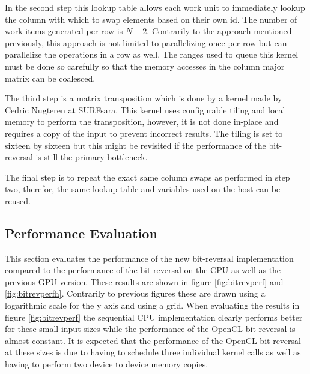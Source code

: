 \documentclass[conference]{IEEEtran}
\begin{document}
In the second step this lookup table allows each work unit to immediately
lookup the column with which to swap elements based on their own id. The number
of work-items generated per row is $N-2$. Contrarily to the approach
mentioned previously, this approach is not limited to parallelizing once per
row but can parallelize the operations in a row as well. The ranges used to
queue this kernel must be done so carefully so that the memory accesses in the
column major matrix can be coalesced.

The third step is a matrix transposition which is done by a kernel made by
Cedric Nugteren at SURFsara\cite{cedric}. This kernel uses configurable tiling
and local memory to perform the transposition, however, it is not done in-place
and requires a copy of the input to prevent incorrect results. The tiling is
set to sixteen by sixteen but this might be revisited if the performance of
the bit-reversal is still the primary bottleneck.

The final step is to repeat the exact same column swaps as performed in step 
two, therefor, the same lookup table and variables used on the host can be
reused.

\subsection{Performance Evaluation}

This section evaluates the performance of the new bit-reversal implementation
compared to the performance of the bit-reversal on the CPU as well as the
previous GPU version. These results are shown in figure \ref{fig:bitrevperf}
and \ref{fig:bitrevperfh}. Contrarily to previous figures these are drawn using
a logarithmic scale for the y axis and using a grid. When evaluating the
results in figure \ref{fig:bitrevperf} the sequential CPU implementation
clearly performs better for these small input sizes while the performance of
the OpenCL bit-reversal is almost constant. It is expected that the
performance of the OpenCL bit-reversal at these sizes is due to having to
schedule three individual kernel calls as well as having to perform two device
to device memory copies.
\end{document}
